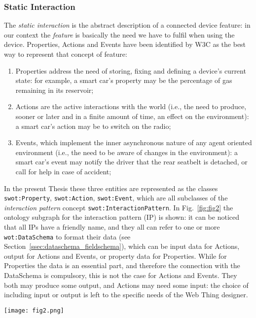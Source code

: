 \subsubsection{\textsf{Static Interaction}}
\label{sssec:static_interaction}
The \textit{static interaction} is the abstract description of a connected device feature: in our context the \textit{feature} is basically the need we have to fulfil when using the device. Properties, Actions and Events have been identified by W3C as the best way to represent that concept of feature:
\begin{enumerate}
    \item Properties address the need of storing, fixing and defining a device's current state: for example, a smart car's property may be the percentage of gas remaining in its reservoir;
    \item Actions are the active interactions with the world (i.e., the need to produce, sooner or later and in a finite amount of time, an effect on the environment): a smart car's action may  be  to  switch  on  the  radio;
    \item Events, which implement the inner asynchronous nature of any agent oriented environment (i.e., the need to be aware of changes in the environment): a  smart car's event may notify the driver that the rear seatbelt is detached, or call for help in case of accident;
\end{enumerate}

In the present Thesis these three entities are represented as the classes \texttt{swot:Property}, \texttt{swot:Action}, \texttt{swot:Event}, which are all subclasses of the \textit{interaction pattern} concept \texttt{swot:InteractionPattern}. In Fig.~\ref{fig:fig2} the ontology subgraph for the interaction pattern (IP) is shown: it can be noticed that all IPs have a friendly name, and they all can refer to one or more \texttt{wot:DataSchema} to format their data (see Section~\ref{ssec:dataschema_fieldschema}), which can be input data for Actions, output for Actions and Events, or property data for Properties. While for Properties the data is an essential part, and therefore the connection with the DataSchema is compulsory, this is not the case for Actions and Events. They both may produce some output, and Actions may need some input: the choice of including input or output is left to the specific needs of the Web Thing designer.

\begin{figure*}[h!]
\vspace{10pt}
\centering
\texttt{[image: fig2.png]}
\vspace{10pt}
\caption{\texttt{swot:InteractionPattern} subset of the ontology. Actions, events and properties are interaction patterns, receiving inputs and giving outputs according to a data schema (see Section~\ref{ssec:dataschema_fieldschema})}
\label{fig:fig2}
\end{figure*}

